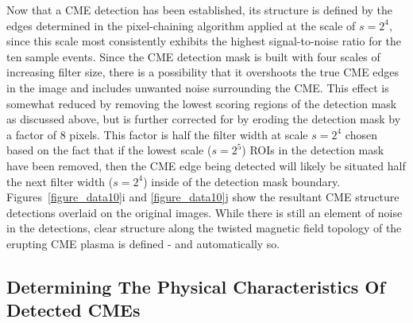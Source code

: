 \documentclass[preprint2]{aastex}
\begin{document}
Now that a CME detection has been established, its structure is defined by the edges determined in the pixel-chaining algorithm applied at the scale of $s=2^{4}$, since this scale most consistently exhibits the highest signal-to-noise ratio for the ten sample events. Since the CME detection mask is built with four scales of increasing filter size, there is a possibility that it overshoots the true CME edges in the image and includes unwanted noise surrounding the CME. This effect is somewhat reduced by removing the lowest scoring regions of the detection mask as discussed above, but is further corrected for by eroding the detection mask by a factor of 8 pixels. This factor is half the filter width at scale $s=2^{4}$ chosen based on the fact that if the lowest scale ($s=2^{5}$) ROIs in the detection mask have been removed, then the CME edge being detected will likely be situated half the next filter width ($s=2^{4}$) inside of the detection mask boundary. Figures~\ref{figure_data10}i and \ref{figure_data10}j show the resultant CME structure detections overlaid on the original images. While there is still an element of noise in the detections, clear structure along the twisted magnetic field topology of the erupting CME plasma is defined - and automatically so.


\subsection{Determining The Physical Characteristics Of Detected CMEs}
\label{sect_kins}
\end{document}
